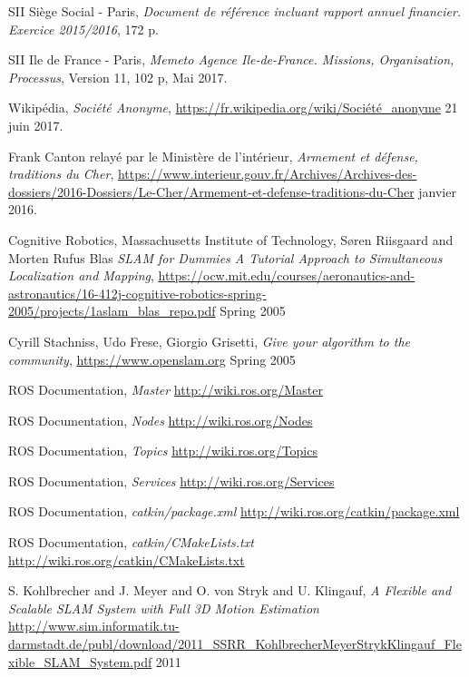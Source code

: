 \begin{thebibliography}{9}

  SII Siège Social - Paris,
  \emph{Document de référence incluant rapport annuel financier. Exercice 2015/2016},
  172 p.
  
  SII Ile de France - Paris,
  \emph{Memeto Agence Ile-de-France. Missions, Organisation, Processus},
  Version 11,
  102 p, 
  Mai 2017.
  
  Wikipédia,
  \emph{Société Anonyme},
  \url{https://fr.wikipedia.org/wiki/Société_anonyme}
  21 juin 2017.
  
  Frank Canton relayé par le Ministère de l'intérieur,
  \emph{Armement et défense, traditions du Cher},
  \url{https://www.interieur.gouv.fr/Archives/Archives-des-dossiers/2016-Dossiers/Le-Cher/Armement-et-defense-traditions-du-Cher}
  janvier 2016.
  
  Cognitive Robotics, Massachusetts Institute of Technology, 
  Søren Riisgaard and Morten Rufus Blas
  \emph{SLAM for Dummies A Tutorial Approach to Simultaneous Localization and Mapping}, 
  \url{https://ocw.mit.edu/courses/aeronautics-and-astronautics/16-412j-cognitive-robotics-spring-2005/projects/1aslam_blas_repo.pdf}
  Spring 2005
  
  Cyrill Stachniss, Udo Frese, Giorgio Grisetti,
  \emph{Give your algorithm to the community}, 
  \url{https://www.openslam.org}
  Spring 2005
 
  ROS Documentation,
  \emph{Master}
  \url{http://wiki.ros.org/Master}
  
  ROS Documentation,
  \emph{Nodes}
  \url{http://wiki.ros.org/Nodes}
  
  ROS Documentation,
  \emph{Topics}
  \url{http://wiki.ros.org/Topics}
  
  ROS Documentation,
  \emph{Services}
  \url{http://wiki.ros.org/Services}
  
  ROS Documentation,
  \emph{catkin/package.xml}
  \url{http://wiki.ros.org/catkin/package.xml}
 
  ROS Documentation,
  \emph{catkin/CMakeLists.txt}
  \url{http://wiki.ros.org/catkin/CMakeLists.txt}
  
  S. Kohlbrecher and J. Meyer and O. von Stryk and U. Klingauf,
  \emph{A Flexible and Scalable SLAM System with Full 3D Motion Estimation}
  \url{http://www.sim.informatik.tu-darmstadt.de/publ/download/2011_SSRR_KohlbrecherMeyerStrykKlingauf_Flexible_SLAM_System.pdf}
  2011
  

\end{thebibliography}
